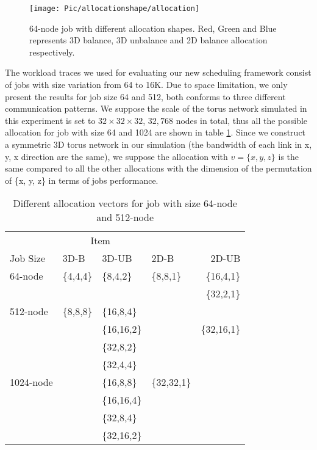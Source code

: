 \documentclass[conference]{IEEEtran}
\begin{document}
\begin{figure}[h!] 
  \centering
  \texttt{[image: Pic/allocationshape/allocation]}
  \caption{64-node job with different allocation shapes. Red, Green and Blue represents 3D balance, 3D unbalance and 2D balance allocation respectively. }
  \label{fig: allocation}
\end{figure}

The workload traces we used for evaluating our new scheduling framework consist of jobs with size variation from 64 to 16K. Due to space limitation, we only present the results for job size 64 and 512, both conforms to three different communication patterns. We suppose the scale of the torus network simulated in this experiment is set to $32 \times 32 \times 32 $, $32,768$ nodes in total, thus all the possible allocation for job with size 64 and 1024 are shown in table \ref{table:allocationvector}. Since we construct a symmetric 3D torus network in our simulation (the bandwidth of each link in x, y, x direction are the same), we suppose the allocation with $v=\{x, y, z\}$ is the same compared to all the other allocations with the dimension of the permutation of \{x, y, z\} in terms of jobs performance.

\begin{table}
\caption{Different allocation vectors for job with size 64-node and 512-node}
\label{table:allocationvector}
\begin{center}
\begin{tabular}{llllr}
\toprule
\multicolumn{4}{c}{Item} \\
\cmidrule(r){2-5}
Job Size    & 3D-B & 3D-UB & 2D-B & 2D-UB  \\
\midrule
64-node      & \{4,4,4\}    & \{8,4,2\}   & \{8,8,1\}  & \{16,4,1\}      \\
             &       &     &      & \{32,2,1\} \\
\midrule
512-node    & \{8,8,8\}   & \{16,8,4\} &     &       \\
            &       & \{16,16,2\} &    &  \{32,16,1\}      \\
            &  & \{32,8,2\} & &\\
            &  & \{32,4,4\} & &\\
\midrule
1024-node    &    & \{16,8,8\} &   \{32,32,1\}  &       \\
            &       & \{16,16,4\} &    &       \\
            &  & \{32,8,4\} & &\\
            &  & \{32,16,2\} & &\\
            
 \bottomrule
\end{tabular}
\end{center}
\end{table}
\end{document}
